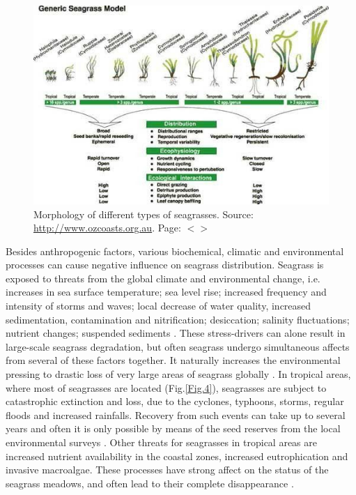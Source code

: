 \documentclass[11pt]{article}
\begin{document}
\begin{figure}
	\centering
	\includegraphics[scale=0.35]{Fig-1-3.jpg}
	\caption{Morphology of different types of seagrasses. Source: \url{http://www.ozcoasts.org.au}. Page: $<$\pageref{page-5}$>$}
	\label{fig:3}
\end{figure}

Besides anthropogenic factors, various biochemical, climatic and environmental processes can cause
negative influence on seagrass distribution. Seagrass is exposed to threats from the global climate and
environmental change, i.e. increases in sea surface temperature\label{page-4}; sea level rise; increased frequency
and intensity of storms and waves; local decrease of water quality, increased sedimentation,
contamination and nitrification; desiccation; salinity fluctuations; nutrient changes; suspended
sediments \cite{Blake00}\label{Blake00}. These stress-drivers can alone result in large-scale seagrass
degradation, but often seagrass undergo simultaneous affects from several of these factors together.
It naturally increases the environmental pressing  to drastic loss of very large areas of
seagrass globally \cite{Orth06}\label{Orth06}.
In tropical areas, where most of seagrasses are located (Fig.\ref{Fig.4}), seagrasses are subject to catastrophic
extinction and loss, due to the cyclones, typhoons, storms, regular floods and increased rainfalls. Recovery from such
events can take up to several years and often it is only possible by means of the seed reserves from the local
environmental surveys \cite{McKenzie07}\label{McKenzie07}. Other threats for seagrasses in tropical areas are 
increased nutrient availability in the coastal zones, increased
eutrophication and invasive macroalgae. These processes have strong affect on the status of the
seagrass meadows, and often lead to their complete disappearance \cite{Holmer09}\label{Holmer09}.
\end{document}
